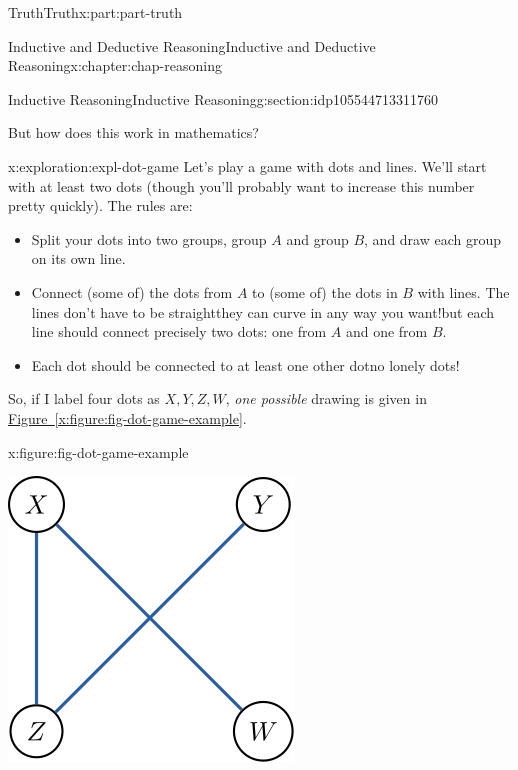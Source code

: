 \documentclass[oneside,10pt,]{book}
\newcommand{\xreffont}{\relax}
\numberwithin{equation}{section}
\begin{document}
\begin{partptx}{Truth}{}{Truth}{}{}{x:part:part-truth}
\begin{chapterptx}{Inductive and Deductive Reasoning}{}{Inductive and Deductive Reasoning}{}{}{x:chapter:chap-reasoning}
\begin{sectionptx}{Inductive Reasoning}{}{Inductive Reasoning}{}{}{g:section:idp105544713311760}
\par
But how does this work in mathematics?%
\begin{exploration}{}{x:exploration:expl-dot-game}%
Let's play a game with dots and lines. We'll start with at least two dots (though you'll probably want to increase this number pretty quickly). The rules are:%
%
\begin{itemize}[label=\textbullet]
\item{}Split your dots into two groups, group \(A\) and group \(B\), and draw each group on its own line.%
\item{}Connect (some of) the dots from \(A\) to (some of) the dots in \(B\) with lines. The lines don't have to be straight\textemdash{}they can curve in any way you want!\textemdash{}but each line should connect precisely two dots: one from \(A\) and one from \(B\).%
\item{}Each dot should be connected to at least one other dot\textemdash{}no lonely dots!%
\end{itemize}
So, if I label four dots as \(X, Y, Z, W\), \emph{one possible} drawing is given in \hyperref[x:figure:fig-dot-game-example]{Figure~{\xreffont\ref{x:figure:fig-dot-game-example}}}.%
\begin{figureptx}{}{x:figure:fig-dot-game-example}{}%
\begin{image}{0.325}{0.35}{0.325}%
\includegraphics[width=\linewidth]{./images/dot-game-example.svg}

\end{image}
\end{figureptx}
\end{exploration}
\end{sectionptx}
\end{chapterptx}
\end{partptx}
\end{document}
